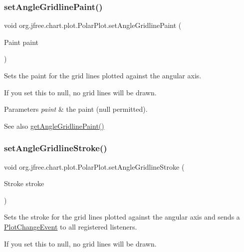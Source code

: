 \subsubsection{\texorpdfstring{set\+Angle\+Gridline\+Paint()}{setAngleGridlinePaint()}}
{\footnotesize\ttfamily void org.\+jfree.\+chart.\+plot.\+Polar\+Plot.\+set\+Angle\+Gridline\+Paint (\begin{DoxyParamCaption}\item[{Paint}]{paint }\end{DoxyParamCaption})}

Sets the paint for the grid lines plotted against the angular axis. 

If you set this to {\ttfamily null}, no grid lines will be drawn.


\begin{DoxyParams}{Parameters}
{\em paint} & the paint ({\ttfamily null} permitted).\\
\hline
\end{DoxyParams}
\begin{DoxySeeAlso}{See also}
\mbox{\hyperlink{classorg_1_1jfree_1_1chart_1_1plot_1_1_polar_plot_a00462036e7ec80bdf00e78b0aea657f2}{get\+Angle\+Gridline\+Paint()}} 
\end{DoxySeeAlso}
\mbox{\label{classorg_1_1jfree_1_1chart_1_1plot_1_1_polar_plot_aba972a51d5f2fb96266662106a3fa01c}} 
\subsubsection{\texorpdfstring{set\+Angle\+Gridline\+Stroke()}{setAngleGridlineStroke()}}
{\footnotesize\ttfamily void org.\+jfree.\+chart.\+plot.\+Polar\+Plot.\+set\+Angle\+Gridline\+Stroke (\begin{DoxyParamCaption}\item[{Stroke}]{stroke }\end{DoxyParamCaption})}

Sets the stroke for the grid lines plotted against the angular axis and sends a \mbox{\hyperlink{}{Plot\+Change\+Event}} to all registered listeners. 

If you set this to {\ttfamily null}, no grid lines will be drawn.


